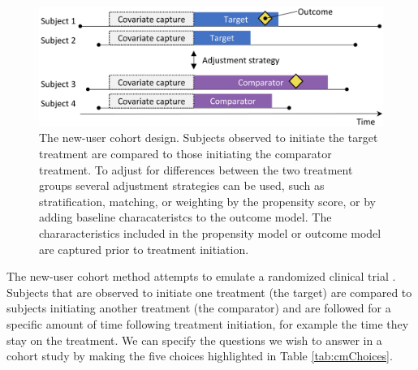 \documentclass[11pt]{book}
\begin{document}
\begin{figure}

{\centering \includegraphics[width=0.9\linewidth]{images/PopulationLevelEstimation/cohortMethod} 

}

\caption{The new-user cohort design. Subjects observed to initiate the target treatment are compared to those initiating the comparator treatment. To adjust for differences between the two treatment groups several adjustment strategies can be used, such as stratification, matching, or weighting by the propensity score, or by adding baseline characateristcs to the outcome model. The chararacteristics included in the propensity model or outcome model are captured prior to treatment initiation.}\label{fig:cohortMethod}
\end{figure}

The new-user cohort method attempts to emulate a randomized clinical
trial \citep{hernan_2016}. Subjects that are observed to initiate one
treatment (the target) are compared to subjects initiating another
treatment (the comparator) and are followed for a specific amount of
time following treatment initiation, for example the time they stay on
the treatment. We can specify the questions we wish to answer in a
cohort study by making the five choices highlighted in Table
\ref{tab:cmChoices}.
\end{document}
